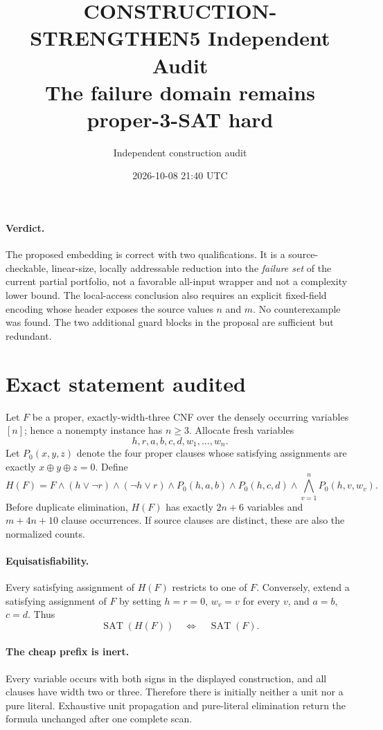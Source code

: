 \documentclass[11pt]{article}
\title{CONSTRUCTION-STRENGTHEN5 Independent Audit\\
The failure domain remains proper-3-SAT hard}
\author{Independent construction audit}
\date{2026-10-08 21:40 UTC}
\newcommand{\SAT}{\operatorname{SAT}}
\newcommand{\Pzero}{P_0}
\begin{document}
\maketitle

\paragraph{Verdict.}
The proposed embedding is correct with two qualifications.  It is a
source-checkable, linear-size, locally addressable reduction into the
\emph{failure set} of the current partial portfolio, not a favorable all-input
wrapper and not a complexity lower bound.  The local-access conclusion also
requires an explicit fixed-field encoding whose header exposes the source
values $n$ and $m$.  No counterexample was found.  The two additional guard
blocks in the proposal are sufficient but redundant.

\section{Exact statement audited}
Let $F$ be a proper, exactly-width-three CNF over the densely occurring
variables $[n]$; hence a nonempty instance has $n\geq 3$.  Allocate fresh
variables
\[
 h,r,a,b,c,d,w_1,\ldots,w_n.
\]
Let $\Pzero(x,y,z)$ denote the four proper clauses whose satisfying
assignments are exactly $x\oplus y\oplus z=0$.  Define
\[
 H(F)=F\wedge(h\vee\neg r)\wedge(\neg h\vee r)
 \wedge\Pzero(h,a,b)\wedge\Pzero(h,c,d)
 \wedge\bigwedge_{v=1}^{n}\Pzero(h,v,w_v).
\]
Before duplicate elimination, $H(F)$ has exactly $2n+6$ variables and
$m+4n+10$ clause occurrences.  If source clauses are distinct, these are also
the normalized counts.

\paragraph{Equisatisfiability.}
Every satisfying assignment of $H(F)$ restricts to one of $F$.  Conversely,
extend a satisfying assignment of $F$ by setting $h=r=0$, $w_v=v$ for every
$v$, and $a=b$, $c=d$.  Thus
\[
 \SAT(H(F))\quad\Longleftrightarrow\quad\SAT(F).
\]

\paragraph{The cheap prefix is inert.}
Every variable occurs with both signs in the displayed construction, and all
clauses have width two or three.  Therefore there is initially neither a unit
nor a pure literal.  Exhaustive unit propagation and pure-literal elimination
return the formula unchanged after one complete scan.
\end{document}
